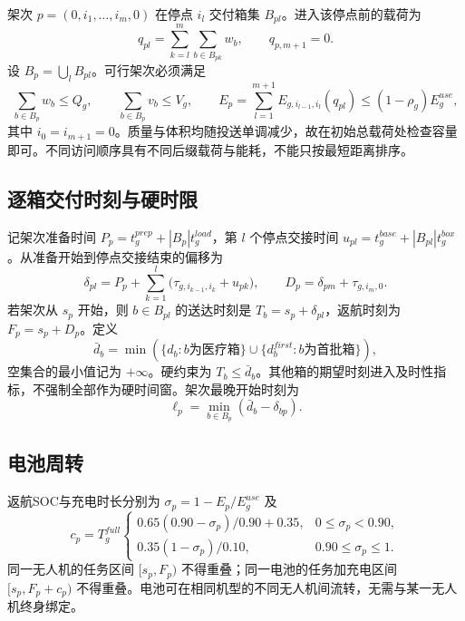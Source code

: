 \documentclass[a4paper,11pt]{article}
\begin{document}
架次 $p=(0,i_1,\ldots,i_m,0)$ 在停点 $i_l$ 交付箱集 $B_{pl}$。进入该停点前的载荷为
\begin{equation}
 q_{pl}=\sum_{k=l}^{m}\sum_{b\in B_{pk}}w_b,\qquad q_{p,m+1}=0.
\end{equation}
设 $B_p=\bigcup_l B_{pl}$。可行架次必须满足
\begin{equation}
 \sum_{b\in B_p}w_b\le Q_g,\qquad
 \sum_{b\in B_p}v_b\le V_g,\qquad
 E_p=\sum_{l=1}^{m+1}E_{g,i_{l-1},i_l}(q_{pl})\le(1-\rho_g)E_g^{use},
\end{equation}
其中 $i_0=i_{m+1}=0$。质量与体积均随投送单调减少，故在初始总载荷处检查容量即可。不同访问顺序具有不同后缀载荷与能耗，不能只按最短距离排序。

\subsection{逐箱交付时刻与硬时限}
记架次准备时间 $P_p=t_g^{prep}+|B_p|t_g^{load}$，第 $l$ 个停点交接时间 $u_{pl}=t_g^{base}+|B_{pl}|t_g^{box}$。从准备开始到停点交接结束的偏移为
\begin{equation}
 \delta_{pl}=P_p+\sum_{k=1}^{l}\big(\tau_{g,i_{k-1},i_k}+u_{pk}\big),\qquad
 D_p=\delta_{pm}+\tau_{g,i_m,0}.
\end{equation}
若架次从 $s_p$ 开始，则 $b\in B_{pl}$ 的送达时刻是 $T_b=s_p+\delta_{pl}$，返航时刻为 $F_p=s_p+D_p$。定义
\begin{equation}
 \bar d_b=\min\left(\{d_b:b\text{为医疗箱}\}\cup
 \{d_b^{first}:b\text{为首批箱}\}\right),
\end{equation}
空集合的最小值记为 $+\infty$。硬约束为 $T_b\le\bar d_b$。其他箱的期望时刻进入及时性指标，不强制全部作为硬时间窗。架次最晚开始时刻为
\begin{equation}
 \ell_p=\min_{b\in B_p}(\bar d_b-\delta_{bp}).
\end{equation}

\subsection{电池周转}
返航SOC与充电时长分别为 $\sigma_p=1-E_p/E_g^{use}$ 及
\begin{equation}
 c_p=T_g^{full}\begin{cases}
 0.65(0.90-\sigma_p)/0.90+0.35,&0\le\sigma_p<0.90,\\
 0.35(1-\sigma_p)/0.10,&0.90\le\sigma_p\le1.
 \end{cases}
\end{equation}
同一无人机的任务区间 $[s_p,F_p)$ 不得重叠；同一电池的任务加充电区间 $[s_p,F_p+c_p)$ 不得重叠。电池可在相同机型的不同无人机间流转，无需与某一无人机终身绑定。
\end{document}
